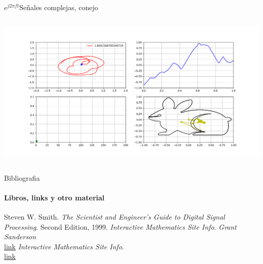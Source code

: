 \begin{frame}{$e^{j2\pi ft}$}{Señales complejas, conejo}
   \handsonicon
   \begin{columns}[onlytextwidth]
      
      
      \centering\includegraphics[width=1.0\textwidth]{2_clase/euler6}
   \end{columns}
   \vfill
\end{frame}
\begin{frame}{Bibliografia}
   \framesubtitle{Libros, links y otro material}
   \begin{thebibliography}{9}
         Steven W. Smith.
         \emph{The Scientist and Engineer's Guide to Digital Signal Processing}.
         Second Edition, 1999.
         \emph{Interactive Mathematics Site Info}.
         \emph{Grant Sanderson} \\
         \href{ https://youtu.be/spUNpyF58BY}{link}
            \emph{Interactive Mathematics Site Info}. \\
            \href {https://www.intmath.com/fourier-series/fourier-intro.php}{link}
   \end{thebibliography}
\end{frame}

